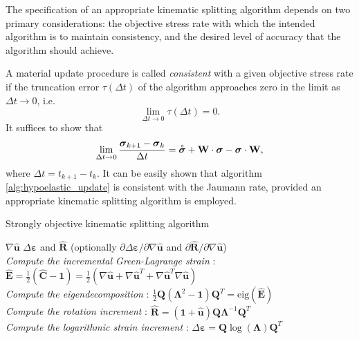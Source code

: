 The specification of an appropriate kinematic splitting algorithm depends on two primary considerations: the objective stress rate with which the intended algorithm is to maintain consistency, and the desired level of accuracy that the algorithm should achieve.

A material update procedure is called \textit{consistent} with a given objective stress rate if the truncation error $\tau(\Delta t)$ of the algorithm approaches zero in the limit as $\Delta t \rightarrow 0$, i.e.
\begin{equation}
    \lim_{\Delta t \rightarrow 0} \tau (\Delta t) = 0.
\end{equation}
It suffices to show that 
\begin{equation}
    \lim_{\Delta t \rightarrow 0} \frac{\boldsymbol{\sigma}_{k+1} - \boldsymbol{\sigma}_{k}}{\Delta t} = \accentset{\circ}{\boldsymbol{\sigma}} + \mathbf{W} \cdot \boldsymbol{\sigma} - \boldsymbol{\sigma} \cdot \mathbf{W},
\end{equation}
where $\Delta t = t_{k+1} - t_{k}$. It can be easily shown that algorithm \ref{alg:hypoelastic_update} is consistent with the Jaumann rate, provided an appropriate kinematic splitting algorithm is employed.


\begin{algorithm}
\begin{spacing}{1.2}
 \caption{Strongly objective kinematic splitting algorithm}
 \label{alg:kinematic_splitting}
 \begin{algorithmic}[1]
 \renewcommand{\algorithmicrequire}{\textbf{Input:  }}
 \renewcommand{\algorithmicensure}{\textbf{Output:  }}
 \REQUIRE $\nabla \hat{\mathbf{u}}$
 \ENSURE $\Delta \boldsymbol{\varepsilon}$ and $\hat{\mathbf{R}}$ (optionally $\partial \Delta \boldsymbol{\varepsilon} / \partial \nabla \hat{\mathbf{u}}$ and $\partial \hat{\mathbf{R}} / \partial \nabla \hat{\mathbf{u}}$)
    \\ \textit{Compute the incremental Green-Lagrange strain} :
    \STATE $\hat{\mathbf{E}} = \frac{1}{2}(\hat{\mathbf{C}} - \mathbf{1}) = \frac{1}{2}(\nabla \hat{\mathbf{u}} + \nabla \hat{\mathbf{u}}^T + \nabla \hat{\mathbf{u}}^T \nabla \hat{\mathbf{u}})$
    \\ \textit{Compute the eigendecomposition} :
    \STATE $\frac{1}{2} \mathbf{Q} (\boldsymbol{\Lambda}^2 - \mathbf{1}) \mathbf{Q}^T = \text{eig} (\hat{\mathbf{E}})$
    \\ \textit{Compute the rotation increment} :
    \STATE $\hat{\mathbf{R}} = (\mathbf{1} + \hat{\mathbf{u}}) \mathbf{Q} \boldsymbol{\Lambda}^{-1} \mathbf{Q}^T$
    \\ \textit{Compute the logarithmic strain increment} :
    \STATE $\Delta \boldsymbol{\varepsilon} = \mathbf{Q} \log (\boldsymbol{\Lambda}) \mathbf{Q}^T$
 \end{algorithmic}
 \end{spacing}
 \end{algorithm}

